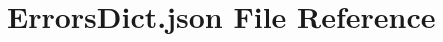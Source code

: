 \hypertarget{_errors_dict_8json}{\section{Errors\-Dict.\-json File Reference}
\label{_errors_dict_8json}
}
